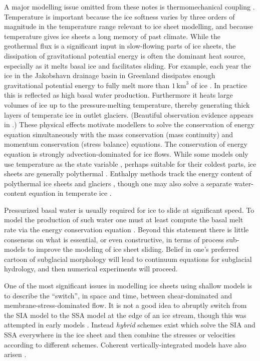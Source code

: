 \documentclass[letterpaper,final,12pt,reqno]{amsart}
\begin{document}
A major modelling issue omitted from these notes is thermomechanical coupling \cite{Blatteretal2010}.  Temperature is important because the ice softness varies by three orders of magnitude in the temperature range relevant to ice sheet modelling, and because temperature gives ice sheets a long memory of past climate.  While the geothermal flux is a significant input in slow-flowing parts of ice sheets, the dissipation of gravitational potential energy is often the dominant heat source, especially as it melts basal ice and facilitates sliding.  For example, each year the ice in the Jakobshavn drainage basin in Greenland dissipates enough gravitational potential energy to fully melt more than $1\,\text{km}^3$ of ice \cite{AschwandenBuelerKhroulevBlatter}.  In practice this is reflected as high basal water production.  Furthermore it heats large volumes of ice up to the pressure-melting temperature, thereby generating thick layers of temperate ice in outlet glaciers.  (Beautiful observation evidence appears in \cite{Luethietal2009}.)  These physical effects motivate modellers to solve the conservation of energy equation simultaneously with the mass conservation (mass continuity) and momentum conservation (stress balance) equations.  The conservation of energy equation is strongly advection-dominated for ice flows.  While some models only use temperature as the state variable \cite{BBL}, perhaps suitable for their coldest parts, ice sheets are generally polythermal \cite{FowlerLarson1978,Greve}.  Enthalpy methods track the energy content of polythermal ice sheets and glaciers \cite{AschwandenBuelerKhroulevBlatter,GreveBlatter2016}, though one may also solve a separate water-content equation in temperate ice \cite{Greve}.

Pressurized basal water is usually required for ice to slide at significant speed.  To model the production of such water one must at least compute the basal melt rate via the energy conservation equation \cite{BBssasliding,BuelervanPelt2015,Clarke05,Raymondenergy,Tulaczyketal2000b}.  Beyond this statement there is little consensus on what is essential, or even constructive, in terms of process sub-models to improve the modeling of ice sheet sliding.  Belief in one's preferred cartoon of subglacial morphology will lead to continuum equations for subglacial hydrology, and then numerical experiments will proceed.

One of the most significant issues in modelling ice sheets using shallow models is to describe the ``switch'', in space and time, between shear-dominated and membrane-stress-dominated flow.  It is not a good idea to abruptly switch from the SIA model to the SSA model at the edge of an ice stream, though this was attempted in early models \cite{HulbeMacAyeal,Ritzetal2001}.  Instead \emph{hybrid} schemes exist which solve the SIA and SSA everywhere in the ice sheet \cite{BBssasliding,PollardDeConto,Winkelmannetal2011} and then combine the stresses or velocities according to different schemes.  Coherent vertically-integrated models have also arisen \cite{BrinkerhoffJohnson2013,Goldberg2011}.
\end{document}
